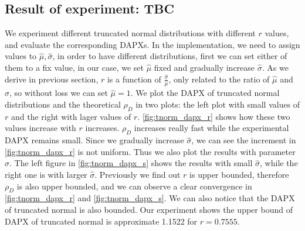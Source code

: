 \subsection{Result of experiment: TBC}
We experiment different truncated normal distributions with different $r$ values, and evaluate the corresponding DAPXs. In the implementation, we need to assign values to $\hat{\mu}, \hat{\sigma}$, in order to have different distributions, first we can set either of them to a fix value, in our case, we set $\hat{\mu}$ fixed and gradually increase $\hat{\sigma}$. As we derive in previous section, $r$ is a function of $\frac{\hat{\sigma}}{\hat{\mu}}$, only related to the ratio of $\hat{\mu}$ and $\hat{\sigma}$, so without loss we can set $\hat{\mu} = 1$. We plot the DAPX of truncated normal distributions and the theoretical $\rho_D$ in two plots: the left plot with small values of $r$ and the right with lager values of $r$. \cref{fig:tnorm_dapx_r} shows how these two values increase with $r$ increases. $\rho_D$ increases really fast while the experimental DAPX remains small. Since we gradually increase $\hat{\sigma}$, we can see the increment in \cref{fig:tnorm_dapx_r} is not uniform. Thus we also plot the results with parameter $\hat{\sigma}$. The left figure in \cref{fig:tnorm_dapx_s} shows the results with small $\hat{\sigma}$, while the right one is with larger $\hat{\sigma}$. Previously we find out $r$ is upper bounded, therefore $\rho_D$ is also upper bounded, and we can observe a clear convergence in \cref{fig:tnorm_dapx_r} and \cref{fig:tnorm_dapx_s}. We can also notice that the DAPX of truncated normal is also bounded. Our experiment shows the upper bound of DAPX of truncated normal is approximate 1.1522 for $r = 0.7555$.

